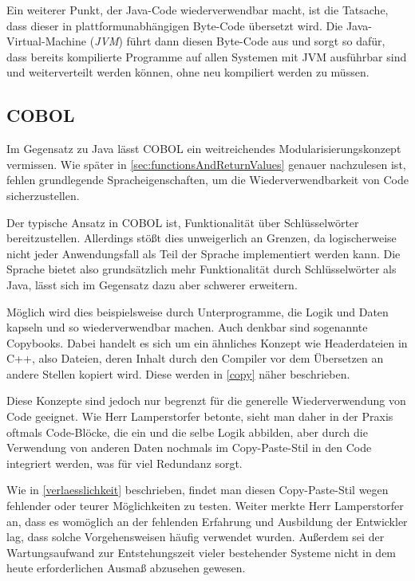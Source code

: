 Ein weiterer Punkt, der Java-Code wiederverwendbar macht, ist die Tatsache, dass dieser in plattformunabhängigen Byte-Code übersetzt wird. Die Java-Virtual-Machine (\textit{JVM}) führt dann diesen Byte-Code aus und sorgt so dafür, dass bereits kompilierte Programme auf allen Systemen mit JVM ausführbar sind und weiterverteilt werden können, ohne neu kompiliert werden zu müssen.

\subsection*{COBOL}
Im Gegensatz zu Java lässt COBOL ein weitreichendes Modularisierungskonzept vermissen. Wie später in \autoref{sec:functionsAndReturnValues} genauer nachzulesen ist, fehlen grundlegende Spracheigenschaften, um die Wiederverwendbarkeit von Code sicherzustellen. 

Der typische Ansatz in COBOL ist, Funktionalität über Schlüsselwörter bereitzustellen. Allerdings stößt dies unweigerlich an Grenzen, da logischerweise nicht jeder Anwendungsfall als Teil der Sprache implementiert werden kann. Die Sprache bietet also grundsätzlich mehr Funktionalität durch Schlüsselwörter als Java, lässt sich im Gegensatz dazu aber schwerer erweitern. 

Möglich wird dies beispielsweise durch Unterprogramme, die Logik und Daten kapseln und so wiederverwendbar machen. Auch denkbar sind sogenannte Copybooks. Dabei handelt es sich um ein ähnliches Konzept wie Headerdateien in C++, also Dateien, deren Inhalt durch den Compiler vor dem Übersetzen an andere Stellen kopiert wird. Diese werden in \autoref{copy} näher beschrieben.

Diese Konzepte sind jedoch nur begrenzt für die generelle Wiederverwendung von Code geeignet. Wie Herr Lamperstorfer betonte, sieht man daher in der Praxis oftmals Code-Blöcke, die ein und die selbe Logik abbilden, aber durch die Verwendung von anderen Daten nochmals im Copy-Paste-Stil in den Code integriert werden, was für viel Redundanz sorgt. 

Wie in \autoref{verlaesslichkeit} beschrieben, findet man diesen Copy-Paste-Stil wegen fehlender oder teurer Möglichkeiten zu testen. Weiter merkte Herr Lamperstorfer an, dass es womöglich an der fehlenden Erfahrung und Ausbildung der Entwickler lag, dass solche Vorgehensweisen häufig verwendet wurden. Außerdem sei der Wartungsaufwand zur Entstehungszeit vieler bestehender Systeme nicht in dem heute erforderlichen Ausmaß abzusehen gewesen.

